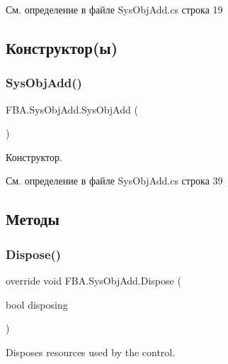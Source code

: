 См. определение в файле Sys\+Obj\+Add.\+cs строка 19



\subsection{Конструктор(ы)}
\mbox{\label{class_f_b_a_1_1_sys_obj_add_a58e9b73e70efa368559e0a5d37b418f0}} 
\subsubsection{\texorpdfstring{Sys\+Obj\+Add()}{SysObjAdd()}}
{\footnotesize\ttfamily F\+B\+A.\+Sys\+Obj\+Add.\+Sys\+Obj\+Add (\begin{DoxyParamCaption}{ }\end{DoxyParamCaption})}



Конструктор. 



См. определение в файле Sys\+Obj\+Add.\+cs строка 39



\subsection{Методы}
\mbox{\label{class_f_b_a_1_1_sys_obj_add_acdd3f1a2189c4c076e2f999065e3eee5}} 
\subsubsection{\texorpdfstring{Dispose()}{Dispose()}}
{\footnotesize\ttfamily override void F\+B\+A.\+Sys\+Obj\+Add.\+Dispose (\begin{DoxyParamCaption}\item[{bool}]{disposing }\end{DoxyParamCaption})\hspace{0.3cm}{\ttfamily [protected]}}



Disposes resources used by the control. 


